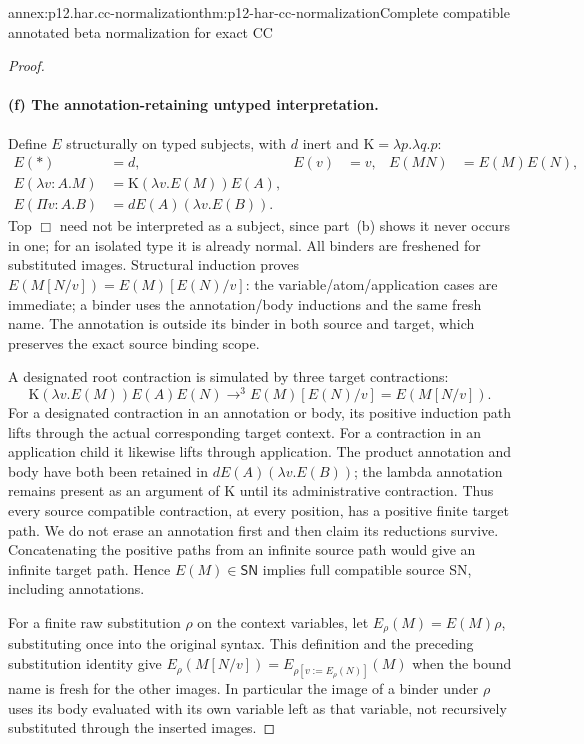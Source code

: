 \begin{annexitem}{annex:p12.har.cc-normalization}{thm:p12-har-cc-normalization}{Complete compatible annotated beta normalization for exact CC}
\begin{proof}
\paragraph{(f) The annotation-retaining untyped interpretation.}
Define \(E\) structurally on typed subjects, with \(d\) inert and
\(\mathrm K=\lambda p.\lambda q.p\):
\[
\begin{aligned}
 E(\ast)&=d,& E(v)&=v,& E(MN)&=E(M)E(N),\\
 E(\lambda v:A.M)&=\mathrm K(\lambda v.E(M))E(A),&&&\\
 E(\Pi v:A.B)&=dE(A)(\lambda v.E(B)).&&&
\end{aligned}
\]
Top \(\Box\) need not be interpreted as a subject, since part~(b) shows
it never occurs in one; for an isolated type it is already normal.
All binders are freshened for substituted images. Structural induction
proves \(E(M[N/v])=E(M)[E(N)/v]\): the variable/atom/application cases
are immediate; a binder uses the annotation/body inductions and the same
fresh name. The annotation is outside its binder in both source and
target, which preserves the exact source binding scope.

A designated root contraction is simulated by three target contractions:
\[
 \mathrm K(\lambda v.E(M))E(A)E(N)
 \longrightarrow^3 E(M)[E(N)/v]=E(M[N/v]).
\]
For a designated contraction in an annotation or body, its positive
induction path lifts through the actual corresponding target context.
For a contraction in an application child it likewise lifts through
application. The product annotation and body have both been retained
in \(dE(A)(\lambda v.E(B))\); the lambda annotation remains present
as an argument of K until its administrative contraction. Thus every
source compatible contraction, at every position, has a positive finite
target path. We do not erase an annotation first and then claim its
reductions survive. Concatenating the positive paths from an infinite
source path would give an infinite target path. Hence \(E(M)\in
\mathsf{SN}\) implies full compatible source SN, including annotations.

For a finite raw substitution \(\rho\) on the context variables, let
\(E_\rho(M)=E(M)\rho\), substituting once into the original syntax.
This definition and the preceding substitution identity give
\(E_\rho(M[N/v])=E_{\rho[v:=E_\rho(N)]}(M)\) when the bound name
is fresh for the other images. In particular the image of a binder
under \(\rho\) uses its body evaluated with its own variable left
as that variable, not recursively substituted through the inserted images.


\end{proof}
\end{annexitem}
